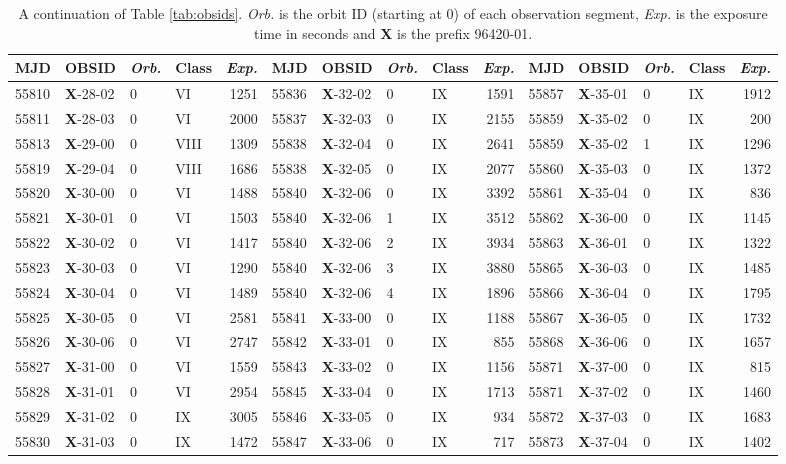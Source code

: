 \begin{table*}
\caption{A continuation of Table \ref{tab:obsids}.  \textit{Orb.} is the orbit ID (starting at 0) of each observation segment, \textit{Exp.} is the exposure time in seconds and \textbf{X} is the prefix 96420-01.}
\label{tab:obsids2}
\begin{tabular}{llllrllllrllllr}
\hline
\hline
MJD&OBSID&\textit{Orb.}&Class&\textit{Exp.}&MJD&OBSID&\textit{Orb.}&Class&\textit{Exp.}&MJD&OBSID&\textit{Orb.}&Class&\textit{Exp.}\\
\hline
55810&\textbf{X}-28-02&0&VI&1251&55836&\textbf{X}-32-02&0&IX&1591&55857&\textbf{X}-35-01&0&IX&1912\\
55811&\textbf{X}-28-03&0&VI&2000&55837&\textbf{X}-32-03&0&IX&2155&55859&\textbf{X}-35-02&0&IX&200\\
55813&\textbf{X}-29-00&0&VIII&1309&55838&\textbf{X}-32-04&0&IX&2641&55859&\textbf{X}-35-02&1&IX&1296\\
55819&\textbf{X}-29-04&0&VIII&1686&55838&\textbf{X}-32-05&0&IX&2077&55860&\textbf{X}-35-03&0&IX&1372\\
55820&\textbf{X}-30-00&0&VI&1488&55840&\textbf{X}-32-06&0&IX&3392&55861&\textbf{X}-35-04&0&IX&836\\
55821&\textbf{X}-30-01&0&VI&1503&55840&\textbf{X}-32-06&1&IX&3512&55862&\textbf{X}-36-00&0&IX&1145\\
55822&\textbf{X}-30-02&0&VI&1417&55840&\textbf{X}-32-06&2&IX&3934&55863&\textbf{X}-36-01&0&IX&1322\\
55823&\textbf{X}-30-03&0&VI&1290&55840&\textbf{X}-32-06&3&IX&3880&55865&\textbf{X}-36-03&0&IX&1485\\
55824&\textbf{X}-30-04&0&VI&1489&55840&\textbf{X}-32-06&4&IX&1896&55866&\textbf{X}-36-04&0&IX&1795\\
55825&\textbf{X}-30-05&0&VI&2581&55841&\textbf{X}-33-00&0&IX&1188&55867&\textbf{X}-36-05&0&IX&1732\\
55826&\textbf{X}-30-06&0&VI&2747&55842&\textbf{X}-33-01&0&IX&855&55868&\textbf{X}-36-06&0&IX&1657\\
55827&\textbf{X}-31-00&0&VI&1559&55843&\textbf{X}-33-02&0&IX&1156&55871&\textbf{X}-37-00&0&IX&815\\
55828&\textbf{X}-31-01&0&VI&2954&55845&\textbf{X}-33-04&0&IX&1713&55871&\textbf{X}-37-02&0&IX&1460\\
55829&\textbf{X}-31-02&0&IX&3005&55846&\textbf{X}-33-05&0&IX&934&55872&\textbf{X}-37-03&0&IX&1683\\
55830&\textbf{X}-31-03&0&IX&1472&55847&\textbf{X}-33-06&0&IX&717&55873&\textbf{X}-37-04&0&IX&1402\\

\end{tabular}
\end{table*}
